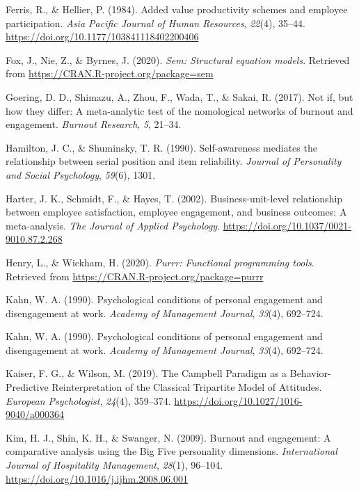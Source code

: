 \documentclass[
  english,
  man]{apa6}
\begin{document}
\leavevmode\hypertarget{ref-ferris_added_1984}{}%
Ferris, R., \& Hellier, P. (1984). Added value productivity schemes and employee participation. \emph{Asia Pacific Journal of Human Resources}, \emph{22}(4), 35--44. \url{https://doi.org/10.1177/103841118402200406}

\leavevmode\hypertarget{ref-R-sem}{}%
Fox, J., Nie, Z., \& Byrnes, J. (2020). \emph{Sem: Structural equation models}. Retrieved from \url{https://CRAN.R-project.org/package=sem}

\leavevmode\hypertarget{ref-goering2017not}{}%
Goering, D. D., Shimazu, A., Zhou, F., Wada, T., \& Sakai, R. (2017). Not if, but how they differ: A meta-analytic test of the nomological networks of burnout and engagement. \emph{Burnout Research}, \emph{5}, 21--34.

\leavevmode\hypertarget{ref-hamilton1990self}{}%
Hamilton, J. C., \& Shuminsky, T. R. (1990). Self-awareness mediates the relationship between serial position and item reliability. \emph{Journal of Personality and Social Psychology}, \emph{59}(6), 1301.

\leavevmode\hypertarget{ref-harter_business-unit-level_2002}{}%
Harter, J. K., Schmidt, F., \& Hayes, T. (2002). Business-unit-level relationship between employee satisfaction, employee engagement, and business outcomes: A meta-analysis. \emph{The Journal of Applied Psychology}. \url{https://doi.org/10.1037/0021-9010.87.2.268}

\leavevmode\hypertarget{ref-R-purrr}{}%
Henry, L., \& Wickham, H. (2020). \emph{Purrr: Functional programming tools}. Retrieved from \url{https://CRAN.R-project.org/package=purrr}

\leavevmode\hypertarget{ref-kahn_psychological_1990}{}%
Kahn, W. A. (1990). Psychological conditions of personal engagement and disengagement at work. \emph{Academy of Management Journal}, \emph{33}(4), 692--724.

\leavevmode\hypertarget{ref-kahn1990psychological}{}%
Kahn, W. A. (1990). Psychological conditions of personal engagement and disengagement at work. \emph{Academy of Management Journal}, \emph{33}(4), 692--724.

\leavevmode\hypertarget{ref-kaiser_campbell_2019}{}%
Kaiser, F. G., \& Wilson, M. (2019). The Campbell Paradigm as a Behavior-Predictive Reinterpretation of the Classical Tripartite Model of Attitudes. \emph{European Psychologist}, \emph{24}(4), 359--374. \url{https://doi.org/10.1027/1016-9040/a000364}

\leavevmode\hypertarget{ref-kim_burnout_2009}{}%
Kim, H. J., Shin, K. H., \& Swanger, N. (2009). Burnout and engagement: A comparative analysis using the Big Five personality dimensions. \emph{International Journal of Hospitality Management}, \emph{28}(1), 96--104. \url{https://doi.org/10.1016/j.ijhm.2008.06.001}
\end{document}

